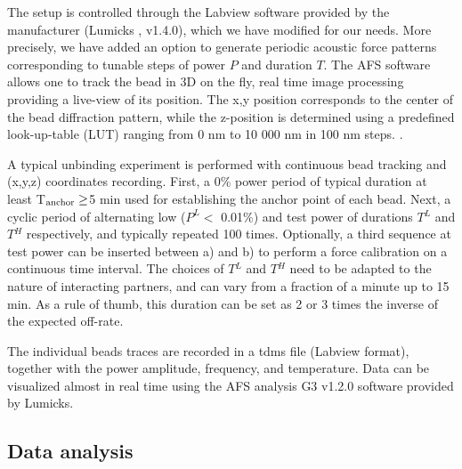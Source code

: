 \documentclass{biophys-new}
\begin{document}
The setup is controlled through the Labview software provided by the manufacturer (Lumicks , v1.4.0), which we have modified for our needs. More precisely, we have added an option to generate periodic acoustic force patterns corresponding to tunable steps of power $P$ and duration $T$. The AFS software allows one to track the bead in 3D on the fly, real time image processing providing a live-view of its position. The x,y position corresponds to the center of the bead diffraction pattern, while the z-position is determined using a predefined look-up-table (LUT) ranging from 0 nm to 10 000 nm in 100 nm steps. . 

A typical unbinding experiment is performed with continuous bead tracking and (x,y,z) coordinates recording. First, a 0\% power period of typical duration at least T$_{\rm anchor}\ge$5 min used for establishing the anchor point of each bead. Next, a cyclic period of alternating low ($P^L <$ 0.01\%) and test power of durations $T{^L}$ and $T{^H}$ respectively, and typically repeated 100 times. Optionally, a third sequence at test power can be inserted between a) and b) to perform a force calibration on a continuous time interval. The choices of $T{^L}$ and $T{^H}$ need to be adapted to the nature of interacting partners, and can vary from a fraction of a minute up to 15 min. As a rule of thumb, this duration can be set as 2 or 3 times the inverse of the expected off-rate.

The individual beads traces are recorded in a tdms file (Labview format), together with the power amplitude, frequency, and temperature. Data can be visualized almost in real time using the AFS analysis G3 v1.2.0 software provided by Lumicks.%



\subsection*{Data analysis}
\end{document}
